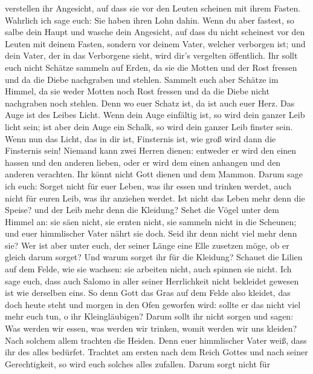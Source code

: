 verstellen ihr Angesicht, auf dass sie vor den Leuten scheinen mit ihrem
Fasten. Wahrlich ich sage euch: Sie haben ihren Lohn dahin.
 Wenn du aber fastest, so salbe dein Haupt und wasche dein
Angesicht,  auf dass du nicht scheinest vor den Leuten mit
deinem Fasten, sondern vor deinem Vater, welcher verborgen ist; und dein
Vater, der in das Verborgene sieht, wird dir's vergelten öffentlich.
 Ihr sollt euch nicht Schätze sammeln auf Erden, da sie die
Motten und der Rost fressen und da die Diebe nachgraben und stehlen.
 Sammelt euch aber Schätze im Himmel, da sie weder Motten
noch Rost fressen und da die Diebe nicht nachgraben noch stehlen.
 Denn wo euer Schatz ist, da ist auch euer Herz.
 Das Auge ist des Leibes Licht. Wenn dein Auge einfältig
ist, so wird dein ganzer Leib licht sein;  ist aber dein
Auge ein Schalk, so wird dein ganzer Leib finster sein. Wenn nun das
Licht, das in dir ist, Finsternis ist, wie groß wird dann die Finsternis
sein!  Niemand kann zwei Herren dienen: entweder er wird
den einen hassen und den anderen lieben, oder er wird dem einen anhangen
und den anderen verachten. Ihr könnt nicht Gott dienen und dem Mammon.
 Darum sage ich euch: Sorget nicht für euer Leben, was ihr
essen und trinken werdet, auch nicht für euren Leib, was ihr anziehen
werdet. Ist nicht das Leben mehr denn die Speise? und der Leib mehr denn
die Kleidung?  Sehet die Vögel unter dem Himmel an: sie
säen nicht, sie ernten nicht, sie sammeln nicht in die Scheunen; und
euer himmlischer Vater nährt sie doch. Seid ihr denn nicht viel mehr
denn sie?  Wer ist aber unter euch, der seiner Länge eine
Elle zusetzen möge, ob er gleich darum sorget?  Und warum
sorget ihr für die Kleidung? Schauet die Lilien auf dem Felde, wie sie
wachsen: sie arbeiten nicht, auch spinnen sie nicht.  Ich
sage euch, dass auch Salomo in aller seiner Herrlichkeit nicht bekleidet
gewesen ist wie derselben eins.  So denn Gott das Gras auf
dem Felde also kleidet, das doch heute steht und morgen in den Ofen
geworfen wird: sollte er das nicht viel mehr euch tun, o ihr
Kleingläubigen?  Darum sollt ihr nicht sorgen und sagen:
Was werden wir essen, was werden wir trinken, womit werden wir uns
kleiden?  Nach solchem allem trachten die Heiden. Denn euer
himmlischer Vater weiß, dass ihr des alles bedürfet. 
Trachtet am ersten nach dem Reich Gottes und nach seiner Gerechtigkeit,
so wird euch solches alles zufallen.  Darum sorgt nicht für
